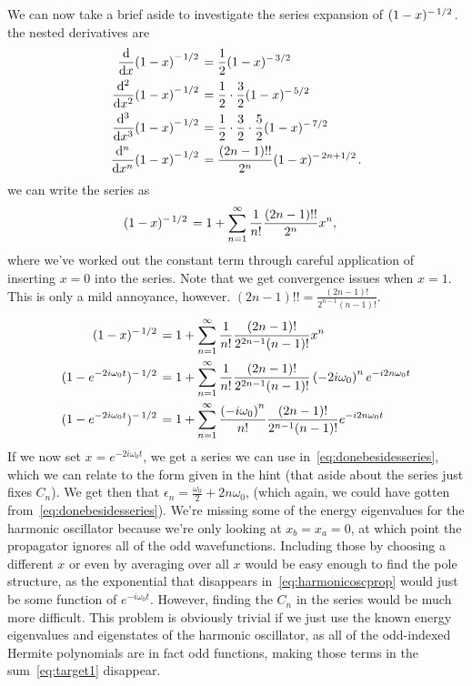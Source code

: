\documentclass{article}
\begin{document}
	We can now take a brief aside to investigate the series expansion of $(1 - x)^{-\flatfrac12}$.
	\triv the nested derivatives are
	\begin{align}
		\dv{x} (1 - x)^{-\flatfrac12} &= \frac{1}{2} (1 - x)^{-\flatfrac32}\\
		\dv[2]{x} (1 - x)^{-\flatfrac12} &= \frac{1}{2} \cdot \frac{3}{2}(1 - x)^{-\flatfrac52}\\
		\dv[3]{x} (1 - x)^{-\flatfrac12} &= \frac{1}{2} \cdot \frac{3}{2} \cdot \frac{5}{2} (1 - x)^{-\flatfrac72}\\
		\dv[n]{x} (1 - x)^{-\flatfrac12} &= \frac{(2n - 1){!}{!}}{2^n} (1 - x)^{-\flatfrac{2n + 1}{2}}.
	\end{align}
	\thrf we can write the series as
	\begin{align}
		(1 - x)^{-\flatfrac12} &= 1 + \sum_{n = 1}^\infty \frac{1}{n{!}} \frac{(2n - 1){!}{!}}{2^n} x^n,
	\end{align}
	where we've worked out the constant term through careful application of inserting $x = 0$ into the series.
	Note that we get convergence issues when $x = 1$.
	This is only a mild annoyance, however.
	\triv $(2n - 1){!}{!} = \frac{(2n - 1){!}}{2^{n - 1}(n - 1){!}}$.
	\thrf
	\begin{align}
		(1 - x)^{-\flatfrac12} &= 1 + \sum_{n = 1}^\infty \frac{1}{n{!}} \frac{(2n - 1){!}}{2^{2 n - 1}(n - 1){!}} x^n \\
		(1 - e^{- 2 i \omega_0 t})^{-\flatfrac12} &= 1 + \sum_{n = 1}^\infty \frac{1}{n{!}} \frac{(2n - 1){!}}{2^{2 n - 1}(n - 1){!}} \left(- 2 i \omega_0 \right)^n e^{- i 2 n \omega_0 t} \\
		(1 - e^{- 2 i \omega_0 t})^{-\flatfrac12} &= 1 + \sum_{n = 1}^\infty \frac{ \left(- i \omega_0 \right)^n }{n{!}} \frac{(2n - 1){!}}{2^{n - 1}(n - 1){!}}e^{- i 2 n \omega_0 t}
	\end{align}
	If we now set $x = e^{- 2 i \omega_0 t}$, we get a series we can use in~\eqref{eq:donebesidesseries}, which we can relate to the form given in the hint (that aside about the series just fixes $C_n$).
	We get then that $\epsilon_n = \frac{\omega_0}{2} + 2 n \omega_0$, (which again, we could have gotten from~\eqref{eq:donebesidesseries}).
	We're missing some of the energy eigenvalues for the harmonic oscillator because we're only looking at $x_b = x_a = 0$, at which point the propagator ignores all of the odd wavefunctions.
	Including those by choosing a different $x$ or even by averaging over all $x$ would be easy enough to find the pole structure, as the exponential that disappears in~\eqref{eq:harmonicoscprop} would just be some function of $e^{-i\omega_0 t}$.
	However, finding the $C_n$ in the series would be much more difficult.
	This problem is obviously trivial if we just use the known energy eigenvalues and eigenstates of the harmonic oscillator, as all of the odd-indexed Hermite polynomials are in fact odd functions, making those terms in the sum~\eqref{eq:target1} disappear.

	\newpage
	\listoftodos
\end{document}
